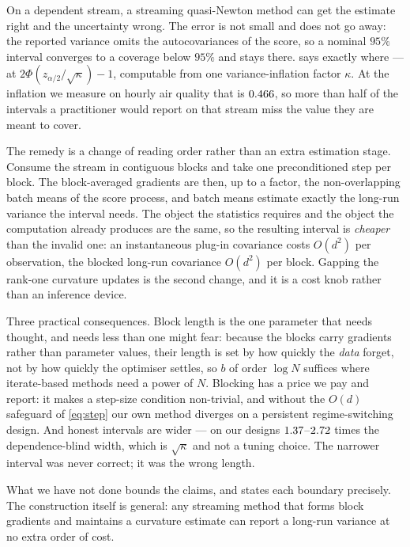 On a dependent stream, a streaming quasi-Newton method can get the estimate right and the uncertainty
wrong. The error is not small and does not go away: the reported variance omits the autocovariances of the
score, so a nominal $95\%$ interval converges to a coverage below $95\%$ and stays there.
 says exactly where --- at $2\Phi(z_{\alpha/2}/\sqrt{\kappa})-1$, computable from one
variance-inflation factor $\kappa$. At the inflation we measure on hourly air quality that is
$0.466$, so more than half of the intervals a practitioner would report on that stream miss the
value they are meant to cover.

The remedy is a change of reading order rather than an extra estimation stage. Consume the stream in
contiguous blocks and take one preconditioned step per block. The block-averaged gradients are then, up to
a factor, the non-overlapping batch means of the score process, and batch means estimate exactly the
long-run variance the interval needs. The object the statistics requires and the object the computation
already produces are the same, so the resulting interval is \emph{cheaper} than the invalid one: an
instantaneous plug-in covariance costs $O(d^2)$ per observation, the blocked long-run covariance $O(d^2)$
per block. Gapping the rank-one curvature updates is the second change, and it is a cost knob rather than
an inference device.

Three practical consequences. Block length is the one parameter that needs thought, and needs less than
one might fear: because the blocks carry gradients rather than parameter values, their length is set by
how quickly the \emph{data} forget, not by how quickly the optimiser settles, so $b$ of order $\log N$
suffices where iterate-based methods need a power of $N$. Blocking has a price we pay and report: it makes
a step-size condition non-trivial, and without the $O(d)$ safeguard of \eqref{eq:step} our own method
diverges on a persistent regime-switching design. And honest intervals are wider --- on our designs
$1.37$--$2.72$ times the dependence-blind width, which is $\sqrt{\kappa}$ and not a
tuning choice. The narrower interval was never correct; it was the wrong length.

What we have not done bounds the claims, and  states each boundary precisely. The
construction itself is general: any streaming method that forms block gradients and maintains a curvature
estimate can report a long-run variance at no extra order of cost.
